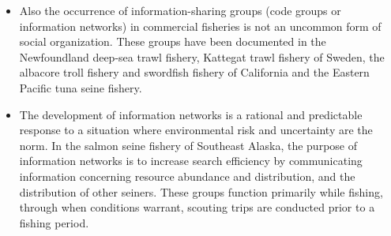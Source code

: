 \documentclass[a4paper,10pt]{article}
\begin{document}
\begin{itemize}
\item Also the occurrence of information-sharing groups (code groups or information networks) in commercial fisheries is not an uncommon form of social organization. These groups have been documented in the Newfoundland deep-sea trawl fishery, Kattegat trawl fishery of Sweden, the albacore troll fishery and swordfish fishery of California and the Eastern Pacific  tuna seine fishery. 
\item The development of information networks is a rational and predictable response to a situation where environmental risk and uncertainty are the norm. In the salmon seine fishery of Southeast Alaska, the purpose of information networks is to increase search efficiency by communicating information concerning resource abundance and distribution, and the distribution of other seiners. These groups function primarily while fishing, through when conditions warrant, scouting trips are conducted prior to a fishing period. 
\end{itemize} 



\end{document}
